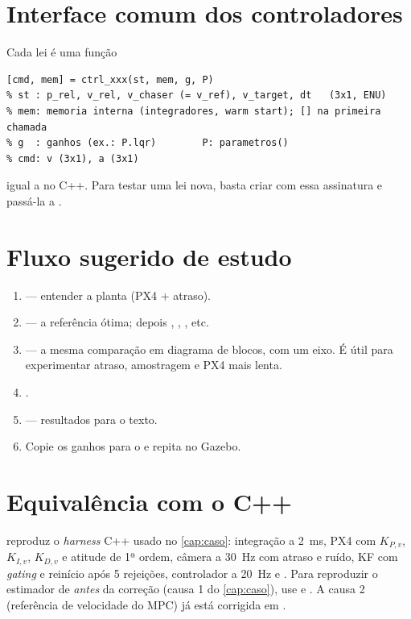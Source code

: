 \section{Interface comum dos controladores}
Cada lei é uma função
\begin{lstlisting}
[cmd, mem] = ctrl_xxx(st, mem, g, P)
% st : p_rel, v_rel, v_chaser (= v_ref), v_target, dt   (3x1, ENU)
% mem: memoria interna (integradores, warm start); [] na primeira chamada
% g  : ganhos (ex.: P.lqr)        P: parametros()
% cmd: v (3x1), a (3x1)
\end{lstlisting}
igual a  no C++. Para testar uma lei nova, basta
criar  com essa assinatura e passá-la a .

\section{Fluxo sugerido de estudo}
\begin{enumerate}
  \item {} --- entender a planta (PX4 + atraso).
  \item {} --- a referência ótima; depois ,
        , ,  etc.
  \item {} --- a mesma comparação em diagrama de blocos,
        com um eixo. É útil para experimentar atraso, amostragem e PX4 mais lenta.
  \item {}.
  \item {} --- resultados para o texto.
  \item Copie os ganhos para o  e repita no Gazebo.
\end{enumerate}

\section{Equivalência com o C++}
 reproduz o \emph{harness} C++ usado no \cref{cap:caso}:
integração a \SI{2}{ms}, PX4 com $K_{P,v}$, $K_{I,v}$, $K_{D,v}$ e atitude de 1ª ordem,
câmera a \SI{30}{Hz} com atraso e ruído, KF com \emph{gating} e reinício após 5 rejeições,
controlador a \SI{20}{Hz} e . Para reproduzir o estimador de
\emph{antes} da correção (causa 1 do \cref{cap:caso}), use 
e . A causa 2 (referência de velocidade do MPC) já está
corrigida em .
